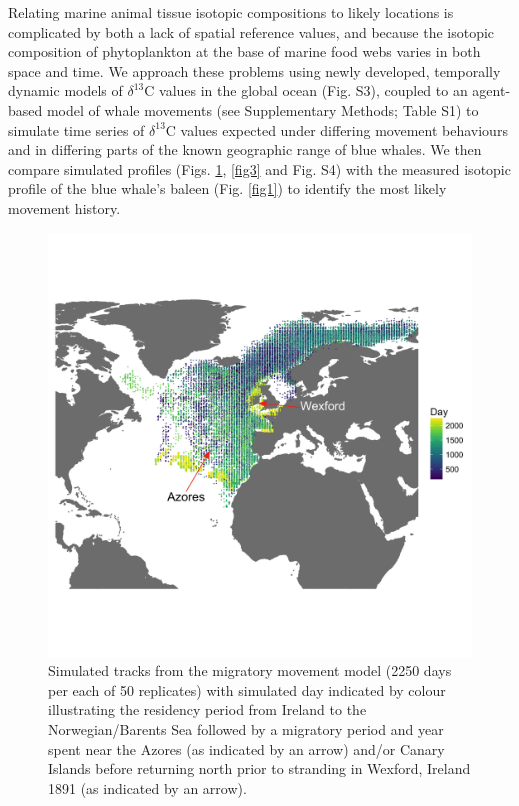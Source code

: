 \documentclass[a4paper,12pt]{article}
\begin{document}
Relating marine animal tissue isotopic compositions to likely locations is complicated by both a lack of spatial reference values, and because the isotopic composition of phytoplankton at the base of marine food webs varies in both space and time. 
We approach these problems using newly developed, temporally dynamic models of $\delta^{13}$C values in the global ocean\cite{magozzi2017using} (Fig. S3), coupled to an agent-based model of whale movements (see Supplementary Methods; Table S1) to simulate time series of $\delta^{13}$C values expected under differing movement behaviours and in differing parts of the known geographic range of blue whales. 
We then compare simulated profiles (Figs. \ref{fig2}, \ref{fig3} and Fig. S4) with the measured isotopic profile of the blue whale's baleen (Fig. \ref{fig1}) to identify the most likely movement history.

\begin{figure}
  \centering
  \includegraphics[width = \linewidth]{figures/Figure-2-migratory-model-full-map.png}
  \caption{Simulated tracks from the migratory movement model (2250 days per each of 50 replicates) with simulated day indicated by colour illustrating the residency period from Ireland to the Norwegian/Barents Sea followed by a migratory period and year spent near the Azores (as indicated by an arrow) and/or Canary Islands before returning north prior to stranding in Wexford, Ireland 1891 (as indicated by an arrow). }
  \label{fig2}
\end{figure}
\end{document}

